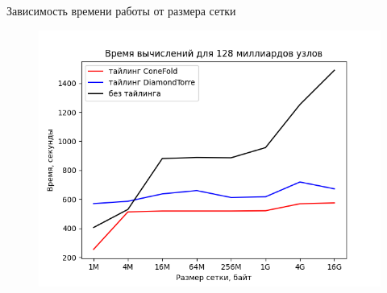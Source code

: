 \documentclass[presentation,18pt]{beamer}
\begin{document}
\begin{frame}[t]
\begin{columns}
		\begin{alertblock}{Зависимость времени работы от размера сетки}
			\begin{figure}
				\includegraphics[width=\textwidth]{img/GraphTiling.png}
			\end{figure}
		\end{alertblock}

	\end{columns}
\end{frame}
\end{document}
